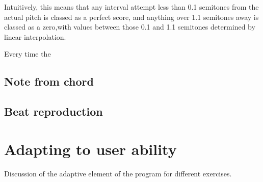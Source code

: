 Intuitively, this means that any interval attempt less than 0.1 semitones from the actual pitch is classed as a perfect score, and anything over 1.1 semitones away is classed as a zero,with values between those 0.1 and 1.1 semitones determined by linear interpolation.

Every time the 


\subsection{Note from chord}
\subsection{Beat reproduction}

\section{Adapting to user ability}
Discussion of the adaptive element of the program for different exercises.
